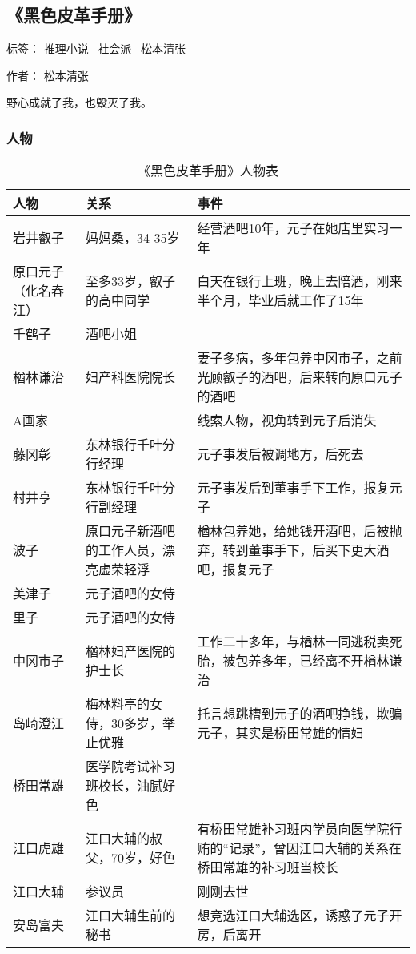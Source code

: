 \subsection{《黑色皮革手册》}

标签： 推理小说 \ 社会派 \  松本清张

作者：  松本清张

野心成就了我，也毁灭了我。

\subsubsection{人物}

\begin{longtable}{p{} | p{} | p{}}
    \caption{《黑色皮革手册》人物表} \\
    人物 & 关系 & 事件 \\
    \hline
\endhead

\hline
\endfoot

岩井叡子 & 妈妈桑，34-35岁 & 经营酒吧10年，元子在她店里实习一年 \\
原口元子（化名春江） & 至多33岁，叡子的高中同学 & 白天在银行上班，晚上去陪酒，刚来半个月，毕业后就工作了15年 \\
千鹤子 &  酒吧小姐 &   \\
楢林谦治  & 妇产科医院院长 &  妻子多病，多年包养中冈市子，之前光顾叡子的酒吧，后来转向原口元子的酒吧 \\
A画家 &    &   线索人物，视角转到元子后消失 \\
藤冈彰 & 东林银行千叶分行经理 & 元子事发后被调地方，后死去 \\
村井亨 & 东林银行千叶分行副经理 & 元子事发后到董事手下工作，报复元子 \\
波子 & 原口元子新酒吧的工作人员，漂亮虚荣轻浮 & 楢林包养她，给她钱开酒吧，后被抛弃，转到董事手下，后买下更大酒吧，报复元子 \\
美津子 & 元子酒吧的女侍 &  \\
里子 & 元子酒吧的女侍 &  \\
中冈市子 & 楢林妇产医院的护士长 & 工作二十多年，与楢林一同逃税卖死胎，被包养多年，已经离不开楢林谦治 \\
岛崎澄江 & 梅林料亭的女侍，30多岁，举止优雅 & 托言想跳槽到元子的酒吧挣钱，欺骗元子，其实是桥田常雄的情妇 \\
桥田常雄 & 医学院考试补习班校长，油腻好色 &   \\
江口虎雄 & 江口大辅的叔父，70岁，好色 & 有桥田常雄补习班内学员向医学院行贿的“记录”，曾因江口大辅的关系在桥田常雄的补习班当校长 \\
江口大辅 & 参议员 & 刚刚去世 \\
安岛富夫 & 江口大辅生前的秘书 & 想竞选江口大辅选区，诱惑了元子开房，后离开 \\

\end{longtable}

